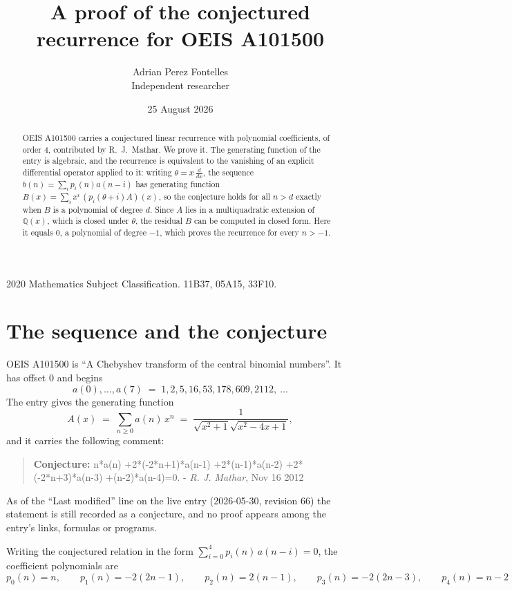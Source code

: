\documentclass[11pt,a4paper]{article}
\title{A proof of the conjectured recurrence for OEIS A101500}
\author{Adrian Perez Fontelles\\ \small Independent researcher}
\date{25 August 2026}
\theoremstyle{plain}
\theoremstyle{definition}
\begin{document}
\maketitle

\begin{abstract}
OEIS A101500 carries a conjectured linear recurrence with polynomial coefficients, of
order 4, contributed by R.~J.~Mathar. We prove it. The generating function of the
entry is algebraic, and the recurrence is equivalent to the vanishing of an explicit
differential operator applied to it: writing $\theta=x\,\frac{d}{dx}$, the sequence
$b(n)=\sum_{i}p_{i}(n)a(n-i)$ has generating function
$B(x)=\sum_{i}x^{i}\,(p_{i}(\theta+i)A)(x)$, so the conjecture holds for all $n>d$ exactly
when $B$ is a polynomial of degree $d$. Since $A$ lies in a multiquadratic extension of
$\mathbb{Q}(x)$, which is closed under $\theta$, the residual $B$ can be computed in
closed form. Here it equals $0$, a polynomial of degree $-1$, which proves
the recurrence for every $n>-1$.
\end{abstract}

\noindent\small 2020 Mathematics Subject Classification. 11B37, 05A15, 33F10.\normalsize

\section{The sequence and the conjecture}

OEIS A101500 is ``A Chebyshev transform of the central binomial numbers''. It has offset $0$ and begins
\[
a(0),\dots,a(7)\;=\;1, 2, 5, 16, 53, 178, 609, 2112,\ \dots
\]
The entry gives the generating function
\begin{equation}\label{eq:gf}
A(x)\;=\;\sum_{n\ge 0} a(n)\,x^{n}\;=\;\frac{1}{\sqrt{x^{2} + 1} \sqrt{x^{2} - 4 x + 1}} ,
\end{equation}
and it carries the following comment:
\begin{quote}\small
\textbf{Conjecture:} n*a(n) +2*(-2*n+1)*a(n-1) +2*(n-1)*a(n-2) +2*(-2*n+3)*a(n-3) +(n-2)*a(n-4)=0. - \emph{R. J. Mathar}, Nov 16 2012
\end{quote}
As of the ``Last modified'' line on the live entry (2026-05-30, revision 66) the
statement is still recorded as a conjecture, and no proof appears among the entry's links,
formulas or programs.

Writing the conjectured relation in the form $\sum_{i=0}^{4}p_{i}(n)\,a(n-i)=0$,
the coefficient polynomials are
\[
p_{0}(n)=n,\qquad p_{1}(n)=- 2 \left(2 n - 1\right),\qquad p_{2}(n)=2 \left(n - 1\right),\qquad p_{3}(n)=- 2 \left(2 n - 3\right),\qquad p_{4}(n)=n - 2
\]
\end{document}
